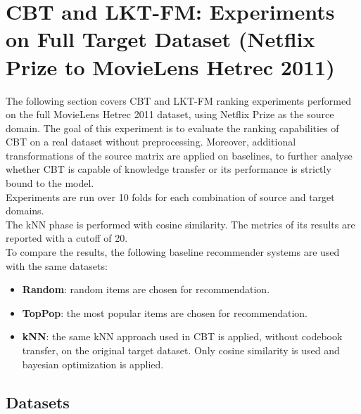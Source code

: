 \clearpage



\section{CBT and LKT-FM: Experiments on Full Target Dataset (Netflix Prize to MovieLens Hetrec 2011)}

The following section covers CBT and LKT-FM ranking experiments performed on the full MovieLens Hetrec 2011 dataset, using Netflix Prize as the source domain. The goal of this experiment is to evaluate the ranking capabilities of CBT on a real dataset without preprocessing. Moreover, additional transformations of the source matrix are applied on baselines, to further analyse whether CBT is capable of knowledge transfer or its performance is strictly bound to the model.\\
Experiments are run over 10 folds for each combination of source and target domains.\\
The kNN phase is performed with cosine similarity. The metrics of its results are reported with a cutoff of 20.\\
To compare the results, the following baseline recommender systems are used with the same datasets:
\begin{itemize}
\item \textbf{Random}: random items are chosen for recommendation.
\item \textbf{TopPop}: the most popular items are chosen for recommendation.
\item \textbf{kNN}: the same kNN approach used in CBT is applied, without codebook transfer, on the original target dataset. Only cosine similarity is used and bayesian optimization is applied.
\end{itemize}


\subsection{Datasets}

